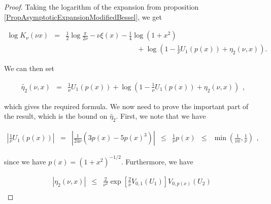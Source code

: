 \documentclass{jams-l}
\theoremstyle{definition}
\theoremstyle{remark}
\numberwithin{equation}{section}
\begin{document}
        \begin{proof}
        
            Taking the logarithm of the expansion from proposition \ref{PropAsymptoticExpansionModifiedBessel}, we get
            
            \[ \begin{array}{lll}
                    \log K_{\nu} \left( \nu x \right) & = & \frac{1}{2} \log \frac{\pi}{2 \nu} - \nu \xi \left( x \right) - \frac{1}{4} \log \left( 1 + x^2 \right) \\[0.5em]
                    
                    && \qquad \qquad \qquad \qquad \qquad + \log \left( 1 - \frac{1}{\nu} U_1 \left( p \left( x \right) \right) + \eta_2 \left( \nu, x \right) \right).
                \end{array} \]
            
            \noindent We can then set
            
            \[ \begin{array}{lll}
                    \widetilde{\eta_2} \left( \nu, x \right) & = & \frac{1}{\nu} U_1 \left( p \left( x \right) \right) + \log \left( 1 - \frac{1}{\nu} U_1 \left( p \left( x \right) \right) + \eta_2 \left( \nu, x \right) \right)
                \end{array} , \]
                
            \noindent which gives the required formula. We now need to prove the important part of the result, which is the bound on $\widetilde{\eta_2}$. First, we note that we have
            
            \[ \begin{array}{lllllll}
                    \left \vert \frac{1}{\nu} U_1 \left( p \left( x \right) \right) \right \vert & = & \left \vert \frac{1}{24 \nu} \left( 3 p \left( x \right) - 5 p \left( x \right)^3 \right) \right \vert & \leqslant & \frac{1}{\nu} p \left( x \right) & \leqslant & \min \left( \frac{1}{\nu x}, \frac{1}{\nu} \right)
                \end{array} , \]
            
            \noindent since we have $p \left( x \right) = \left( 1 + x^2 \right)^{-1/2}$. Furthermore, we have
            
            \[ \begin{array}{lll}
                    \left \vert \eta_2 \left( \nu, x \right) \right \vert & \leqslant & \frac{2}{\nu^2} \exp \left[ \frac{2}{\nu} V_{0,1} \left( U_1 \right) \right] V_{0,p\left( x \right)} \left( U_2 \right) \\[0.5em]
                    

\end{array}\]
\end{proof}
\end{document}
